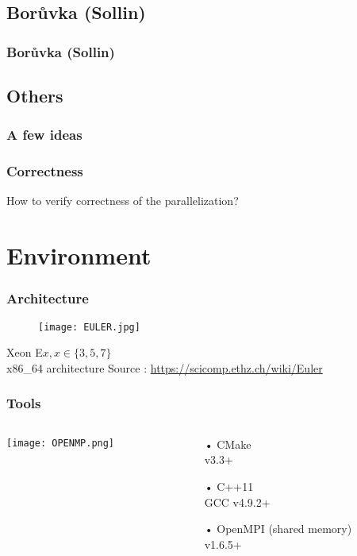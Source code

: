 \documentclass{beamer}
\begin{document}
\subsection{Borůvka (Sollin)}
\begin{frame}
\frametitle{Borůvka (Sollin)}
\end{frame}
\subsection{Others}
\begin{frame}
\frametitle{A few ideas}
\end{frame}
\begin{frame}
\frametitle{Correctness}
How to verify correctness of the parallelization?
\end{frame}


\section{Environment}
\begin{frame}
\frametitle{Architecture}
\begin{figure}
\texttt{[image: EULER.jpg]}
\end{figure}


\vspace{.5 cm}

Xeon E$x, x\in\{3, 5, 7\}$\\x86\_64 architecture
\vfill
{
\tiny
Source : 
\url{https://scicomp.ethz.ch/wiki/Euler}
}
\end{frame}
\begin{frame}
\frametitle{Tools}
\begin{columns}
\begin{column}{.4\linewidth}
\texttt{[image: OPENMP.png]}
\end{column}

\begin{column}{.6\linewidth}
\begin{itemize}
\item[•] CMake\\\hspace{.5cm}v3.3+
\vspace{.2cm}
\item[•] C++11\\\hspace{.5cm}GCC v4.9.2+
\vspace{.2cm}
\item[•] OpenMPI (shared memory)\\\hspace{.5cm}v1.6.5+
\end{itemize}
\end{column}
\end{columns}

\end{frame}
\end{document}
